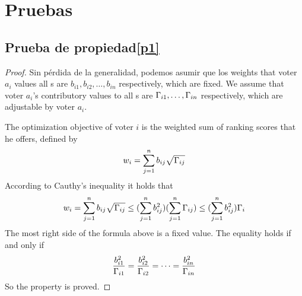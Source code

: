 \section{Pruebas}
\subsection{Prueba de propiedad\ref{p1}}
\label{subsection:proof1}
\begin{proof}
	Sin pérdida de la generalidad, podemos asumir que los weights that voter $a_i$
	values all {\dapp}s are $b_{i1}, b_{i2}, \ldots, b_{in}$ respectively, which are
	fixed. We assume that voter $a_i$'s contributory values to all {\dapp}s are
	$\Gamma_{i1},\ldots,\Gamma_{in}$ respectively, which are adjustable by voter $a_i$.

	The optimization objective of voter $i$ is the weighted sum of ranking scores that he offers, defined by
	$$w_i = \sum_{j=1}^n b_{ij}\sqrt{\Gamma_{ij}}$$
	According to Cauthy's inequality it holds that
	$$w_i = \sum_{j=1}^n b_{ij}\sqrt{\Gamma_{ij}} \leq (\sum_{j=1}^n b_{ij}^2)(\sum_{j=1}^n \Gamma_{ij}) \leq (\sum_{j=1}^n b_{ij}^2)\Gamma_i$$
	The most right side of the formula	above is a fixed value. The equality holds if and only if
	$$\frac{b_{i1}^2}{\Gamma_{i1}}=\frac{b_{i2}^2}{\Gamma_{i2}}=\cdots=\frac{b_{in}^2}{\Gamma_{in}}$$
	So the property is proved.
\end{proof}

